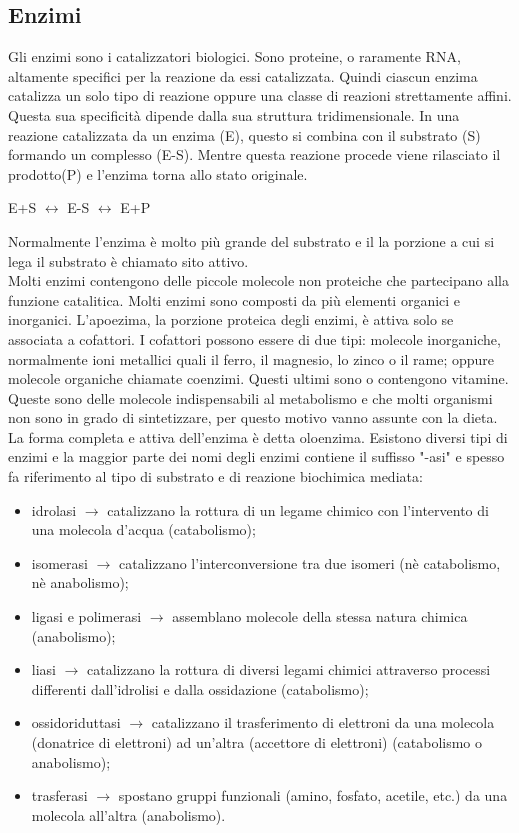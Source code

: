 \subsection{Enzimi}
Gli enzimi sono i catalizzatori biologici. Sono proteine, o raramente RNA, altamente specifici per la reazione da essi catalizzata. Quindi ciascun enzima catalizza un solo tipo di reazione oppure una classe di reazioni strettamente affini. Questa sua specificit\`a dipende dalla sua struttura tridimensionale. In una reazione catalizzata da un enzima (E), questo si combina con il substrato (S) formando un complesso (E-S). Mentre questa reazione procede viene rilasciato il prodotto(P) e l'enzima torna allo stato originale.
\\
\begin{center}E+S $\leftrightarrow$ E-S $\leftrightarrow$ E+P\end{center}
Normalmente l'enzima \`e molto pi\`u grande del substrato e il la porzione a cui si lega il substrato \`e chiamato sito attivo.
\\Molti enzimi contengono delle piccole molecole non proteiche che partecipano alla funzione catalitica. Molti enzimi sono composti da pi\`u elementi organici e inorganici. L'apoezima, la porzione proteica degli enzimi, \`e attiva solo se associata a cofattori. I cofattori possono essere di due tipi: molecole inorganiche, normalmente ioni metallici quali il ferro, il magnesio, lo zinco o il rame; oppure molecole organiche chiamate coenzimi. Questi ultimi sono o contengono vitamine. Queste sono delle molecole indispensabili al metabolismo e che molti organismi non sono in grado di sintetizzare, per questo motivo vanno assunte con la dieta. La forma completa e attiva dell'enzima \`e detta oloenzima.
Esistono diversi tipi di enzimi e la maggior parte dei nomi degli enzimi contiene il suffisso "-asi" e spesso fa riferimento al tipo di substrato e di reazione biochimica mediata:
\begin{itemize}
    \item idrolasi $\xrightarrow{}$ catalizzano la rottura di un legame chimico con l'intervento di una molecola d'acqua (catabolismo);
    \item isomerasi $\xrightarrow{}$ catalizzano l'interconversione tra due isomeri (n\`e catabolismo, n\`e anabolismo);
    \item ligasi e polimerasi $\xrightarrow{}$ assemblano molecole della stessa natura chimica (anabolismo);
    \item liasi $\xrightarrow{}$ catalizzano la rottura di diversi legami chimici attraverso processi differenti dall'idrolisi e dalla ossidazione (catabolismo);
    \item ossidoriduttasi $\xrightarrow{}$ catalizzano il trasferimento di elettroni da una molecola (donatrice di elettroni) ad un'altra (accettore di elettroni) (catabolismo o anabolismo);
    \item trasferasi $\xrightarrow{}$ spostano gruppi funzionali (amino, fosfato, acetile, etc.) da una molecola all'altra (anabolismo).
\end{itemize}
